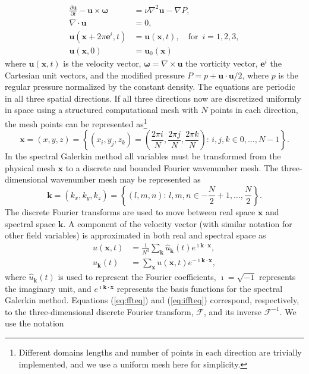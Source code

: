 \documentclass[final,1p,times]{elsarticle}
\newcounter{bla}
\begin{document}
\begin{align}
 \frac{\partial \bm{u}}{\partial t} - \bm{u} \times \bm{\omega}   &= \nu \nabla^2 \bm{u} - \nabla{P}, \label{eq:NS} \\
 \nabla \cdot \bm{u} &= 0, \\
 \bm{u}(\bm{x}+2\pi \bm{e}^i, t) &= \bm{u}(\bm{x}, t), \quad \text{for }\, i=1,2,3,\\
 \bm{u}(\bm{x}, 0) &= \bm{u}_0(\bm{x})
\end{align}
where $\bm{u}(\bm{x}, t)$ is the velocity vector, $\bm{\omega}=\nabla \times \bm{u}$ the vorticity vector, $\bm{e}^i$ the Cartesian unit vectors, and the modified pressure $P=p+\bm{u}\cdot \bm{u}/2$, where $p$ is the regular pressure normalized by the constant density. The equations are periodic in all three spatial directions. If all three directions now are discretized uniformly in space using a structured computational mesh with $N$ points in each direction, the mesh points can be represented as\footnote{Different domains lengths and number of points in each direction are trivially implemented, and we use a uniform mesh here for simplicity.}
\begin{equation}
\bm{x} = (x, y, z) = \left\{(x_i, y_j, z_k) = \left( \frac{2\pi i}{N}, \frac{2\pi j}{N}, \frac{2\pi k}{N} \right): \, i,j,k \in 0,\ldots, N-1 \right\}.
\label{eq:realmesh}
\end{equation}
In the spectral Galerkin method all variables must be transformed from the physical mesh $\bm{x}$ to a discrete and bounded Fourier wavenumber mesh. The three-dimensional wavenumber mesh may be represented as
\begin{equation}
\bm{k} = (k_x, k_y, k_z) = \left\{(l, m, n): \, l, m, n \in -\frac{N}{2}+1,\ldots, \frac{N}{2} \right\}.
\label{eq:kmesh}
\end{equation}
The discrete Fourier transforms are used to move between real space $\bm{x}$ and spectral space $\bm{k}$. A component of the velocity vector (with similar notation for other field variables) is approximated in both real and spectral space as
\begin{align}
u(\bm{x}, t) &= \frac{1}{N^3}\sum_{\bm{k}} \hat{u}_{\bm{k}}(t) e^{\imath \bm{k}\cdot \bm{x}}, \label{eq:ffteq} \\
\hat{u}_{\bm{k}}(t) &= \sum_{\bm{x}} u(\bm{x}, t) e^{-\imath \bm{k}\cdot \bm{x}},\label{eq:iffteq}
\end{align}
where $\hat{u}_{\bm{k}}(t)$ is used to represent the Fourier coefficients, $\imath=\sqrt{-1}$ represents the imaginary unit, and $e^{\imath \bm{k}\cdot \bm{x}}$ represents the basis functions for the spectral Galerkin method. Equations (\ref{eq:ffteq}) and (\ref{eq:iffteq}) correspond, respectively, to the three-dimensional discrete Fourier transform, $\mathcal{F}$, and its inverse $\mathcal{F}^{-1}$. We use the notation
\end{document}
